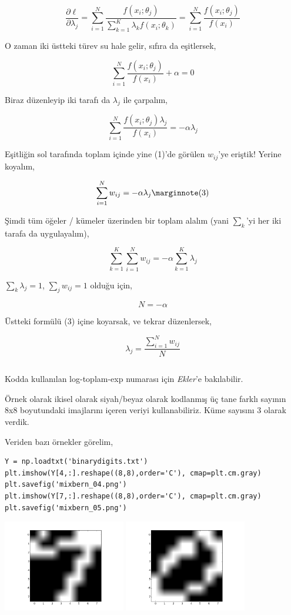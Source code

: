 \documentclass[12pt,fleqn]{article}\usepackage{../../common}
\begin{document}
$$ 
\frac{\partial \ell}{\partial \lambda_j}  = 
\sum_{i=1}^{N}
\frac{f(x_i;\theta_j)}{\sum_{k=1}^{K} \lambda_k f(x_i;\theta_k) }
=
\sum_{i=1}^{N}
\frac{f(x_i;\theta_j)}{f(x_i) }
$$

O zaman iki üstteki türev su hale gelir, sıfıra da eşitlersek,

$$  
\sum_{i=1}^{N} \frac{f(x_i;\theta_j)}{f(x_i) } + \alpha = 0
$$

Biraz düzenleyip iki tarafı da $\lambda_j$ ile çarpalım,

$$
\sum_{i=1}^{N} \frac{f(x_i;\theta_j) \lambda_j}{f(x_i) } = - \alpha \lambda_j 
$$

Eşitliğin sol tarafında toplam içinde yine (1)'de görülen $w_{ij}$'ye eriştik!
Yerine koyalım,

$$
\sum_{i=1}^{N} w_{ij} = - \alpha \lambda_j 
\mlabel{3} 
$$

Şimdi tüm öğeler / kümeler üzerinden bir toplam alalım (yani $\sum_k$'yi her iki
tarafa da uygulayalım),

$$
\sum_{k=1}^{K} \sum_{i=1}^{N} w_{ij} = - \alpha  \sum_{k=1}^{K} \lambda_j
$$


$\sum_k \lambda_j = 1$, $\sum_j w_{ij} = 1$ olduğu için,

$$ 
N = - \alpha 
$$

Üstteki formülü (3) içine koyarsak, ve tekrar düzenlersek,

$$ 
\lambda_j = \frac{\sum_{i=1}^{N} w_{ij}}{N} 
$$

\inputminted[fontsize=\footnotesize]{python}{mixbern.py}

Kodda kullanılan log-toplam-exp numarası için {\em Ekler}'e bakılabilir.

Örnek olarak ikisel olarak siyah/beyaz olarak kodlanmış üç tane farklı sayının
8x8 boyutundaki imajlarını içeren veriyi kullanabiliriz. Küme sayısını 3 olarak
verdik.

Veriden bazı örnekler görelim,

\begin{verbatim}
Y = np.loadtxt('binarydigits.txt')
plt.imshow(Y[4,:].reshape((8,8),order='C'), cmap=plt.cm.gray)
plt.savefig('mixbern_04.png')
plt.imshow(Y[7,:].reshape((8,8),order='C'), cmap=plt.cm.gray)
plt.savefig('mixbern_05.png')
\end{verbatim}

\includegraphics[height=4cm]{mixbern_04.png}
\includegraphics[height=4cm]{mixbern_05.png}
\end{document}
